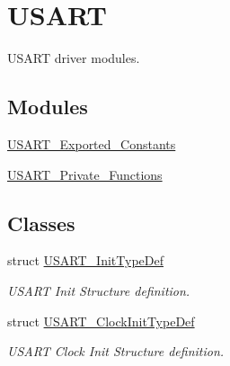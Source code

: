 \hypertarget{group___u_s_a_r_t}{}\section{U\+S\+A\+RT}
\label{group___u_s_a_r_t}


U\+S\+A\+RT driver modules.  


\subsection*{Modules}
\begin{DoxyCompactItemize}
\item 
\hyperlink{group___u_s_a_r_t___exported___constants}{U\+S\+A\+R\+T\+\_\+\+Exported\+\_\+\+Constants}
\item 
\hyperlink{group___u_s_a_r_t___private___functions}{U\+S\+A\+R\+T\+\_\+\+Private\+\_\+\+Functions}
\end{DoxyCompactItemize}
\subsection*{Classes}
\begin{DoxyCompactItemize}
\item 
struct \hyperlink{struct_u_s_a_r_t___init_type_def}{U\+S\+A\+R\+T\+\_\+\+Init\+Type\+Def}
\begin{DoxyCompactList}\small\item\em U\+S\+A\+RT Init Structure definition. \end{DoxyCompactList}\item 
struct \hyperlink{struct_u_s_a_r_t___clock_init_type_def}{U\+S\+A\+R\+T\+\_\+\+Clock\+Init\+Type\+Def}
\begin{DoxyCompactList}\small\item\em U\+S\+A\+RT Clock Init Structure definition. \end{DoxyCompactList}\end{DoxyCompactItemize}
